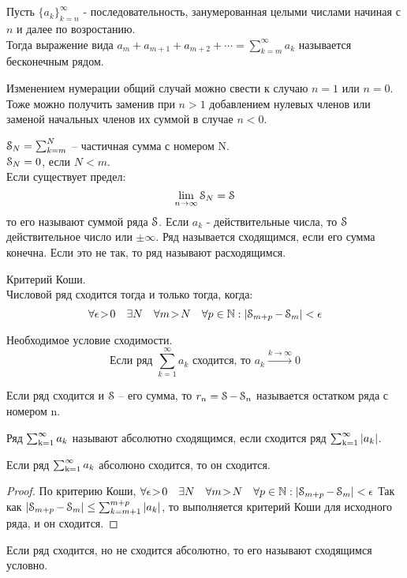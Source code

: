 \setcounter{chapter}{0}
\chapter{}
\begin{deff}
Пусть $ \{a_k \}_{k=n}^{\infty} $ - последовательность, занумерованная целыми числами начиная с $ n $ и далее по возростанию.\\
Тогда выражение вида $a_m+a_{m+1}+a_{m+2}+ \cdots = \sum_{k=m}^{\infty} a_k$ называется бесконечным рядом.\\
\end{deff}
Изменением нумерации общий случай можно свести к случаю $n=1$ или $n=0$.
Тоже можно получить заменив при $n>1$ добавлением нулевых членов или заменой начальных членов их суммой в случае $n<0$.
\begin{deff}
$ \operatorname{\EuScript{S}}_{N} = \sum_{k=m}^{N} $ -- частичная сумма с номером N.\\
$ \operatorname{\EuScript{S}}_{N} = 0 $, если $ N < m $.\\
Если существует предел:
$$ \lim_{n \to \infty} {\operatorname{\EuScript{S}}_N} = \operatorname{\EuScript{S}} $$
то его называют суммой ряда $\operatorname{\EuScript{S}}$. Если $a_k$ - действительные числа, то $\operatorname{\EuScript{S}}$ действительное число или $\pm \infty$.
Ряд называется сходящимся, если его сумма конечна. 
Если это не так, то ряд называют расходящимся.
\end{deff}
\begin{st}Критерий Коши.\\
Числовой ряд сходится тогда и только тогда, когда:
$$ \forall{\epsilon\!>\! 0} \quad \exists N \quad \forall m \! >\! N \quad \forall p \in \operatorname{\mathbb{N}} : \left| \operatorname{\EuScript{S}}_{m+p} - \operatorname{\EuScript{S}}_m \right| < \epsilon$$ 
\end{st}
\begin{st}Необходимое условие сходимости.\\
$$ \mbox{Если ряд } \sum_{k=1}^{\infty} a_k \mbox{ сходится, то } a_k \xrightarrow{k\to\infty}0$$
\end{st}
\begin{deff}
Если ряд сходится и $\operatorname{\EuScript{S}}$ -- его сумма, то $r_n = \operatorname{\EuScript{S}} - \operatorname{\EuScript{S}}_n$ называется остатком ряда с номером n.
\end{deff}
\begin{deff}
Ряд $\operatorname{\sum_{k=1}^{\infty}} a_k $ называют абсолютно сходящимся, если сходится ряд $\operatorname{\sum_{k=1}^{\infty}} |a_k| $.
\end{deff}
\begin{thm}
Если ряд $\operatorname{\sum_{k=1}^{\infty}} a_k$ абсолюно сходится, то он сходится.
\end{thm}
\begin{proof}
По критерию Коши, $ \forall{\epsilon\!>\! 0} \quad \exists N \quad \forall m \! >\! N \quad \forall p \in \operatorname{\mathbb{N}} : \left| \operatorname{\EuScript{S}}_{m+p} - \operatorname{\EuScript{S}}_m \right| < \epsilon$
Так как $\left| \operatorname{\EuScript{S}}_{m+p} - \operatorname{\EuScript{S}}_m \right| \le \sum_{k=m+1}^{m+p}|a_k|$, то выполняется критерий Коши для исходного ряда, и он сходится.
\end{proof}
\begin{deff}
Если ряд сходится, но не сходится абсолютно, то его называют сходящимся условно.
\end{deff}
